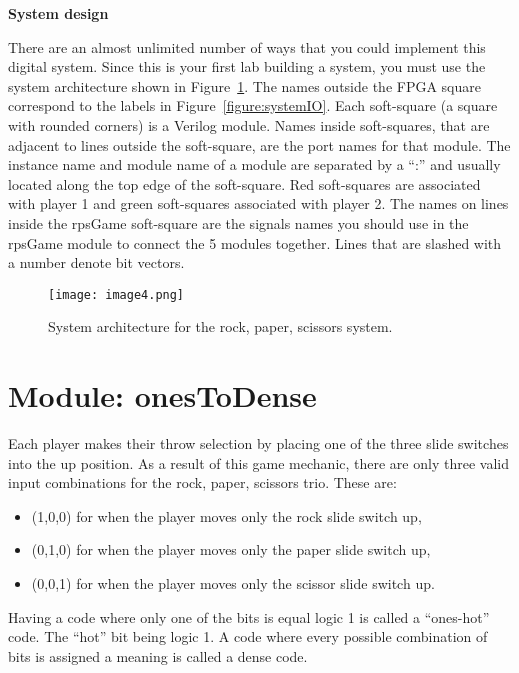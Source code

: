 \textbf{System design}

There are an almost unlimited number of ways that you could implement
this digital system. Since this is your first lab building a system, you
must use the system architecture shown in Figure~\ref{fig:sysArch}. The names outside
the FPGA square correspond to the labels in Figure~\ref{figure:systemIO}. Each soft-square
(a square with rounded corners) is a Verilog module. Names inside
soft-squares, that are adjacent to lines outside the soft-square, are
the port names for that module. The instance name and module name of a
module are separated by a ``:'' and usually located along the top edge
of the soft-square. Red soft-squares are associated with player 1 and
green soft-squares associated with player 2. The names on lines inside
the rpsGame soft-square are the signals names you should use in the
rpsGame module to connect the 5 modules together. Lines that are slashed
with a number denote bit vectors.

\begin{figure}[ht]
\texttt{[image:  image4.png]}
\caption{System architecture for the rock, paper, scissors system.}
\label{fig:sysArch}
\end{figure}

\hypertarget{onestodense-module}{%
\section{Module: onesToDense}
\label{onestodense-module}}

Each player makes their throw selection by placing one of the three
slide switches into the up position. As a result of this game mechanic,
there are only three valid input combinations for the rock, paper,
scissors trio. These are:

\begin{itemize}
\item
  (1,0,0) for when the player moves only the rock slide switch up,
\item
  (0,1,0) for when the player moves only the paper slide switch up,
\item
  (0,0,1) for when the player moves only the scissor slide switch up.
\end{itemize}

Having a code where only one of the bits is equal logic 1 is called a
``ones-hot'' code. The ``hot'' bit being logic 1. A code where every
possible combination of bits is assigned a meaning is called a dense
code.


